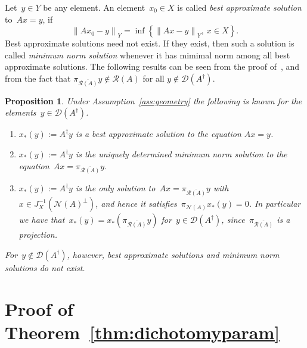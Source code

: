 \documentclass[12pt]{amsart}
\newcommand{\norm}[2]{\left\|#1\right\|_{#2}}
\newcommand{\set}[1]{\left\{#1\right\}}
\newcommand{\lr}[1]{\left(#1\right)}
\newcommand{\domain}{\mathcal D}
\newcommand{\range}{\mathcal R}
\newcommand{\N}{\mathcal N}
\newcommand{\Ad}{A^\dag}
\newcommand{\xast}{x_\ast}
\newcommand{\pr}{\pi_{\overline{\range(A)}}}
\newtheorem{proposition}{Proposition}%
\theoremstyle{remark}
\begin{document}
Let~$y\in Y$ be any element. An element~$x_{0}\in X$ is called \emph{best
  approximate solution} to~$Ax =y$, if
$$
\norm{A x_{0} - y}{Y} = \inf\set{\norm{A x - y}{Y},\ x\in X}.
$$
Best approximate solutions need not exist. If they exist, then such a solution
is called \emph{minimum norm solution} whenever it has mimimal norm among all
best approximate solutions.
The following results can be seen from the proof of~\cite[Thm.~3.2]{MR2024990}, and from the fact
that $\pr y \notin \range(A)$ for all $y \notin \domain(\Ad)$.
\begin{proposition}\label{prop:xast}
  Under Assumption~\ref{ass:geometry} the following is known for the
  elements~$y\in\domain(\Ad)$.
  \begin{enumerate}
\item\label{it:xast} $\xast(y) := \Ad y$ is a best approximate
  solution to the equation $A x = y$.
\item \label{it:xast2} $\xast(y) := \Ad y$ is the uniquely determined minimum norm solution to the equation~$A x =
  \pi_{\overline{\range(A)}}y$.
  \item \label{it:xast3}  $\xast(y) := \Ad y$
  is the only solution to~$A x = \pr y$ with~$x\in
  J_{X}^{-1}\lr{\N(A)^{\perp}}$, and hence it satisfies~$\pi_{\N(A)}\xast(y)=0$.
  In particular we have that~$\xast(y)= \xast(\pr y)$ for~$y\in\domain(\Ad)$, since~$\pr$ is a projection.
 \end{enumerate}
For~$y\notin\domain(\Ad)$, however, best approximate solutions and minimum norm solutions do not exist.
\end{proposition}
                          


\section{Proof of Theorem~\ref{thm:dichotomyparam}}
\label{sec:proof}
\end{document}
